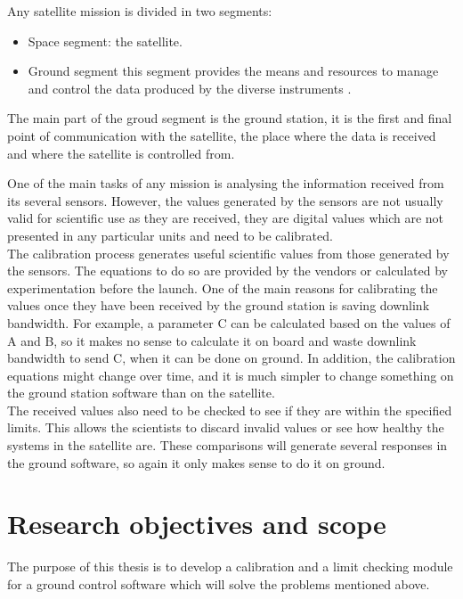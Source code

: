 Any satellite mission is divided in two segments:
\begin{itemize}

	\item Space segment: the satellite.
	\item Ground segment this segment provides the means and resources to manage and control the data produced by the diverse instruments \cite{ESA}. 

\end{itemize}

The main part of the groud segment is the ground station, it is the first and final point of communication with the satellite, the place where the data is received and where the satellite is controlled from.


One of the main tasks of any mission is analysing the information received from its several sensors. However, the values generated by the sensors are not usually valid for scientific use as they are received, they are digital values which are not presented in any particular units and need to be calibrated.\\

The calibration process generates useful scientific values from those generated by the sensors. The equations to do so are provided by the vendors or calculated by experimentation before the launch. One of the main reasons for calibrating the values once they have been received by the ground station is saving downlink bandwidth. For example, a parameter C can be calculated based on the values of A and B, so it makes no sense to calculate it on board and waste downlink bandwidth to send C, when it can be done on ground.  In addition, the calibration equations might change over time, and it is much simpler to change something on the ground station software than on the satellite.\\


The received values also need to be checked to see if they are within the specified limits. This allows the scientists to discard invalid values or see how healthy the systems in the satellite are. These comparisons will generate several responses in the ground software, so again it only makes sense to do it on ground. 


\section{Research objectives and scope}

The purpose of this thesis is to develop a calibration and a limit checking module for a ground control software which will solve the problems mentioned above.\\

